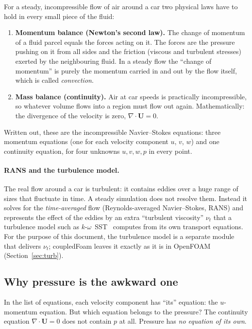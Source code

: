 \documentclass[11pt,a4paper]{article}
\newcommand{\vect}[1]{\mathbf{#1}}
\newcommand{\Uv}{\vect{U}}
\begin{document}
For a steady, incompressible flow of air around a car two physical laws have
to hold in every small piece of the fluid:
\begin{enumerate}
\item \textbf{Momentum balance (Newton's second law).} The change of
  momentum of a fluid parcel equals the forces acting on it. The forces are
  the pressure pushing on it from all sides and the friction (viscous and
  turbulent stresses) exerted by the neighbouring fluid. In a steady flow
  the ``change of momentum'' is purely the momentum carried in and out by
  the flow itself, which is called \emph{convection}.
\item \textbf{Mass balance (continuity).} Air at car speeds is practically
  incompressible, so whatever volume flows into a region must flow out
  again. Mathematically: the divergence of the velocity is zero,
  $\nabla\cdot\Uv=0$.
\end{enumerate}
Written out, these are the incompressible Navier--Stokes equations: three
momentum equations (one for each velocity component $u$, $v$, $w$) and one
continuity equation, for four unknowns $u,v,w,p$ in every point.

\paragraph{RANS and the turbulence model.}
The real flow around a car is turbulent: it contains eddies over a huge
range of sizes that fluctuate in time. A steady simulation does not resolve
them. Instead it solves for the \emph{time-averaged} flow (Reynolds-averaged
Navier--Stokes, RANS) and represents the effect of the eddies by an extra
``turbulent viscosity'' $\nu_t$ that a turbulence model such as
$k$-$\omega$~SST~\cite{Menter1994} computes from its own transport
equations. For the purpose of this document, the turbulence model is a
separate module that delivers $\nu_t$; coupledFoam leaves it exactly as it
is in OpenFOAM (Section~\ref{sec:turb}).

\subsection{Why pressure is the awkward one}\label{sec:pressurehard}

In the list of equations, each velocity component has ``its''
equation: the $u$-momentum equation. But which equation belongs to the
pressure? The continuity equation $\nabla\cdot\Uv=0$ does not contain $p$
at all. Pressure has \emph{no equation of its own}.
\end{document}
